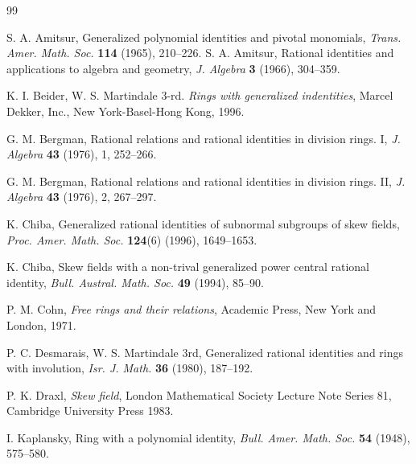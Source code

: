 \documentclass{cimart}
\begin{document}


	
\begin{thebibliography}{99}
	
	 S. A. Amitsur, Generalized polynomial identities and pivotal monomials, {\it Trans. Amer. Math. Soc.} {\bf 114} (1965), 210--226.	
	 S. A. Amitsur, Rational identities and applications to algebra and geometry, {\it J.  Algebra} {\bf 3} (1966), 304--359.
	
	 K. I. Beider, W. S. Martindale 3-rd.  {\it Rings with generalized indentities}, Marcel Dekker, Inc., New York-Basel-Hong Kong, 1996.
	
	 G. M. Bergman, Rational relations and rational identities in division rings. I, \textit{J. Algebra} \textbf{43} (1976),  1, 252–266.
	
	 G. M. Bergman, Rational relations and rational identities in division rings. II, \textit{J. Algebra} \textbf{43} (1976),  2, 267–297.
	
	 K. Chiba, Generalized rational identities of subnormal subgroups of skew fields, \textit{Proc.
		Amer. Math. Soc.} \textbf{124}(6) (1996), 1649–1653.
	
	 K. Chiba, Skew fields with a non-trival generalized power central rational identity, {\it Bull. Austral. Math. Soc.} {\bf 49} (1994), 85--90.
	
	 P. M. Cohn, {\it Free rings and their relations}, Academic Press, New York and London, 1971.
	
	
	 P. C. Desmarais, W. S. Martindale 3rd,
	Generalized rational identities and rings with involution,
	\textit{Isr. J. Math.} \textbf{36} (1980), 187--192.
	
	 P. K. Draxl, {\it Skew field}, London Mathematical Society Lecture Note Series 81, Cambridge University Press 1983.
	
	 I. Kaplansky, {Ring with a polynomial identity}, {\it Bull. Amer. Math. Soc. }{\bf 54} (1948), 575--580. 
	

\end{thebibliography}
\end{document}
